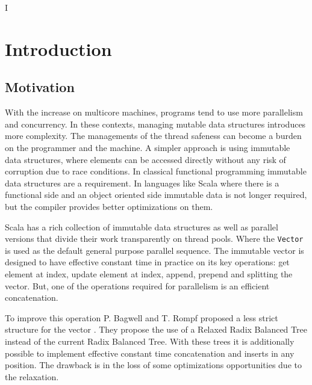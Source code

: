 I%
\lhead{} 

\chapter{Introduction} %
\label{Introduction} %



\section{Motivation}
With the increase on multicore machines, programs tend to use more parallelism and concurrency. In these contexts, managing mutable data structures introduces more complexity. The managements of the thread safeness can become a burden on the programmer and the machine. A simpler approach is using immutable data structures, where elements can be accessed directly without any risk of corruption due to race conditions. In classical functional programming immutable data structures are a requirement. In languages like Scala where there is a functional side and an object oriented side immutable data is not longer required, but the compiler provides better optimizations on them.

Scala has a rich collection of immutable data structures as well as parallel versions that divide their work transparently on thread pools. Where the \texttt{Vector} is used as the default general purpose parallel sequence. The immutable vector is designed to have effective constant time in practice on its key operations: get element at index, update element at index, append, prepend and splitting the vector. But, one of the operations required for parallelism is an efficient concatenation.

To improve this operation P. Bagwell and T. Rompf proposed a less strict structure for the vector \cite{RRBTrees}. They propose the use of a Relaxed Radix Balanced Tree instead of the current Radix Balanced Tree. With these trees it is additionally possible to implement effective constant time concatenation and inserts in any position. The drawback is in the loss of some optimizations opportunities due to the relaxation.

